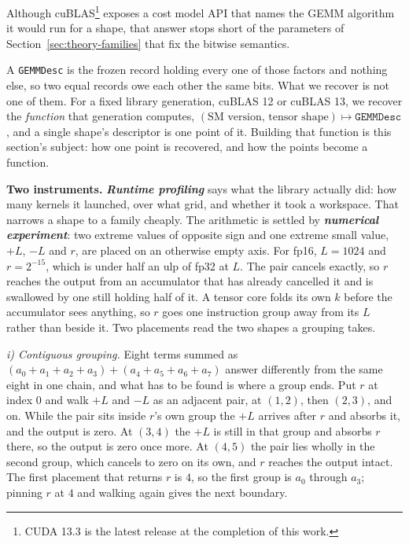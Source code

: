 \documentclass[sigplan,nonacm]{acmart}
\begin{document}
Although cuBLAS\footnote{CUDA 13.3 is the latest release at the completion of
this work.} exposes a cost model API that names the GEMM algorithm it would run
for a shape, that answer stops short of the parameters of
Section~\ref{sec:theory-families} that fix the bitwise semantics.

A \texttt{GEMMDesc} is the frozen record holding every one of those factors and
nothing else, so two equal records owe
each other the same bits. What we recover is not one of them. For a fixed
library generation, cuBLAS 12 or cuBLAS 13, we recover the \emph{function}
that generation computes, $(\text{SM version},\, \text{tensor
shape})\allowbreak \longmapsto \allowbreak \texttt{GEMMDesc}$, and a single
shape's descriptor is one point of it. Building that function is
this section's subject: how one point is recovered, and how the points become a
function.

\textbf{Two instruments.} \textbf{\emph{Runtime profiling}} says what the library actually
did: how many kernels it launched, over what grid, and whether it took a
workspace. That narrows a shape to a family cheaply. 
The arithmetic is settled by \textbf{\emph{numerical experiment}}: two extreme
values of opposite sign and one extreme small value, $+L$, $-L$ and $r$, are
placed on an otherwise empty axis. For fp16, $L = 1024$ and $r = 2^{-15}$, which
is under half an ulp of fp32 at $L$. The pair cancels exactly, so $r$ reaches
the output from an accumulator that has already cancelled it and is swallowed by
one still holding half of it. 
A tensor core folds its own $k$ before the accumulator sees anything, so $r$
goes one instruction group away from its $L$ rather than beside it. 
Two placements read the two shapes a grouping
takes. 

\textit{i) Contiguous grouping.} Eight terms summed as
$(a_0 + a_1 + a_2 + a_3) + (a_4 + a_5 + a_6 + a_7)$ answer differently from the
same eight in one chain, and what has to be found is where a group ends. Put $r$
at index $0$ and walk $+L$ and $-L$ as an adjacent pair, at $(1,2)$, then
$(2,3)$, and on. While the pair sits inside $r$'s own group the $+L$ arrives
after $r$ and absorbs it, and the output is zero. At $(3,4)$ the $+L$ is still in
that group and absorbs $r$ there, so the output is zero once more. At $(4,5)$
the pair lies wholly in the second group, which cancels to zero on its own, and
$r$ reaches the output intact. The first placement that returns $r$ is $4$, so
the first group is $a_0$ through $a_3$; pinning $r$ at $4$ and walking again
gives the next boundary.
\end{document}
